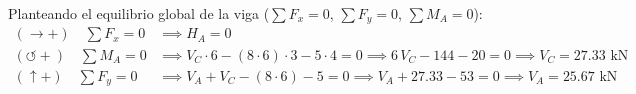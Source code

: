 Planteando el equilibrio global de la viga ($\sum F_x = 0$, $\sum F_y = 0$, $\sum M_A = 0$):
\begin{align}
    (\rightarrow +) \quad \sum F_x = 0      & \implies \boxed{H_A = 0}                                                                                                         \\
    (\circlearrowleft +) \quad \sum M_A = 0 & \implies V_C \cdot 6 - (8 \cdot 6) \cdot 3 - 5 \cdot 4 = 0 \implies 6\,V_C - 144 - 20 = 0 \implies \boxed{V_C = 27.33\text{ kN}} \\
    (\uparrow +) \quad \sum F_y = 0         & \implies V_A + V_C - (8 \cdot 6) - 5 = 0 \implies V_A + 27.33 - 53 = 0 \implies \boxed{V_A = 25.67\text{ kN}}
\end{align}


